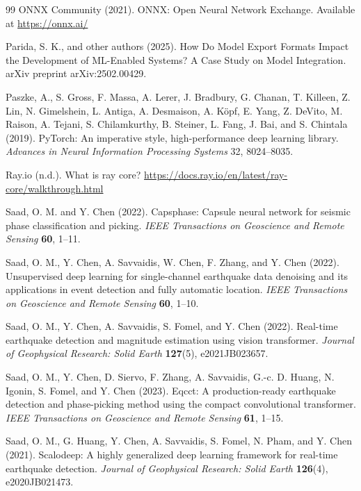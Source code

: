\begin{thebibliography}{99}
ONNX Community (2021). ONNX: Open Neural Network Exchange. Available at \url{https://onnx.ai/}

Parida, S. K., and other authors (2025). How Do Model Export Formats Impact the Development of ML-Enabled Systems? A Case Study on Model Integration. arXiv preprint arXiv:2502.00429.

Paszke, A., S. Gross, F. Massa, A. Lerer, J. Bradbury, G. Chanan, T. Killeen, Z. Lin, N. Gimelshein, L. Antiga, A. Desmaison, A. Köpf, E. Yang, Z. DeVito, M. Raison, A. Tejani, S. Chilamkurthy, B. Steiner, L. Fang, J. Bai, and S. Chintala (2019). PyTorch: An imperative style, high-performance deep learning library. \textit{Advances in Neural Information Processing Systems} 32, 8024--8035.

Ray.io (n.d.). What is ray core? \url{https://docs.ray.io/en/latest/ray-core/walkthrough.html}

Saad, O. M. and Y. Chen (2022). Capsphase: Capsule neural network for seismic phase classification and picking. \textit{IEEE Transactions on Geoscience and Remote Sensing} \textbf{60}, 1--11.

Saad, O. M., Y. Chen, A. Savvaidis, W. Chen, F. Zhang, and Y. Chen (2022). Unsupervised deep learning for single-channel earthquake data denoising and its applications in event detection and fully automatic location. \textit{IEEE Transactions on Geoscience and Remote Sensing} \textbf{60}, 1--10.

Saad, O. M., Y. Chen, A. Savvaidis, S. Fomel, and Y. Chen (2022). Real-time earthquake detection and magnitude estimation using vision transformer. \textit{Journal of Geophysical Research: Solid Earth} \textbf{127}(5), e2021JB023657.

Saad, O. M., Y. Chen, D. Siervo, F. Zhang, A. Savvaidis, G.-c. D. Huang, N. Igonin, S. Fomel, and Y. Chen (2023). Eqcct: A production-ready earthquake detection and phase-picking method using the compact convolutional transformer. \textit{IEEE Transactions on Geoscience and Remote Sensing} \textbf{61}, 1--15.

Saad, O. M., G. Huang, Y. Chen, A. Savvaidis, S. Fomel, N. Pham, and Y. Chen (2021). Scalodeep: A highly generalized deep learning framework for real-time earthquake detection. \textit{Journal of Geophysical Research: Solid Earth} \textbf{126}(4), e2020JB021473.


\end{thebibliography}
